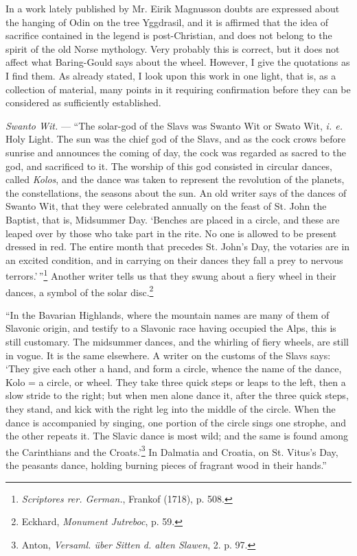 \documentclass[a4paper, 11pt, oneside, polutonikogreek, english]{article}
\begin{document}
In a work lately published by Mr. Eirik Magnusson doubts are expressed about the hanging of Odin on the tree Yggdrasil, and it is affirmed that the idea of sacrifice contained in the legend is post-Christian, and does not belong to the spirit of the old Norse mythology. Very probably this is correct, but it does not affect what Baring-Gould says about the wheel. However, I give the quotations as I find them. As already stated, I look upon this work in one light, that is, as a collection of material, many points in it requiring confirmation before they can be considered as sufficiently established.

\emph{Swanto Wit.} --- ``The solar-god of the Slavs was Swanto Wit or Swato Wit, \emph{i. e.} Holy Light. The sun was the chief god of the Slavs, and as the cock crows before sunrise and announces the coming of day, the cock was regarded as sacred to the god, and sacrificed to it. The worship of this god consisted in circular dances, called \emph{Kolos}, and the dance was taken to represent the revolution of the planets, the constellations, the seasons about the sun. An old writer says of the dances of Swanto Wit, that they were celebrated annually on the feast of St. John the Baptist, that is, Midsummer Day. `Benches are placed in a circle, and these are leaped over by those who take part in the rite. No one is allowed to be present dressed in red. The entire month that precedes St. John's Day, the votaries are in an excited condition, and in carrying on their dances they fall a prey to nervous terrors.'\,''\footnote{\emph{Scriptores rer. German.}, Frankof (1718), p. 508.} Another writer tells us that they swung about a fiery wheel in their dances, a symbol of the solar disc.\footnote{Eckhard, \emph{Monument Jutreboc}, p. 59.}

``In the Bavarian Highlands, where the mountain names are many of them of Slavonic origin, and testify to a Slavonic race having occupied the Alps, this is still customary. The midsummer dances, and the whirling of fiery wheels, are still in vogue. It is the same elsewhere. A writer on the customs of the Slavs says: `They give each other a hand, and form a circle, whence the name of the dance, Kolo = a circle, or wheel. They take three quick steps or leaps to the left, then a slow stride to the right; but when men alone dance it, after the three quick steps, they stand, and kick with the right leg into the middle of the circle. When the dance is accompanied by singing, one portion of the circle sings one strophe, and the other repeats it. The Slavic dance is most wild; and the same is found among the Carinthians and the Croats.'\footnote{Anton, \emph{Versaml. über Sitten d. alten Slawen}, 2. p. 97.} In Dalmatia and Croatia, on St. Vitus's Day, the peasants dance, holding burning pieces of fragrant wood in their hands.''
\end{document}
